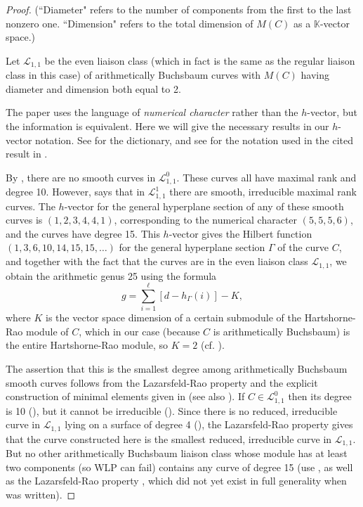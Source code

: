 \documentclass[12pt]{amsart}%
\numberwithin{equation}{section}
\theoremstyle{definition}
\numberwithin{equation}{section}
\begin{document}
   \begin{proof} 
    (``Diameter" refers to the number of components from the first to the last nonzero one. ``Dimension" refers to the total dimension of $M(C)$ as a $\mathbb{K}$-vector space.)


    Let $\mathcal L_{1,1}$ be the even liaison class (which in fact is the same as the regular liaison class in this case) of arithmetically Buchsbaum curves with $M(C)$ having diameter and dimension both equal to 2. 
    
    The paper \cite{BM2} uses the language of {\it numerical character} rather than the $h$-vector, but the information is equivalent. Here we will give the necessary results in our $h$-vector notation. See \cite[\S 1]{GM3}  for the dictionary, and see \cite[Notation 1.1]{BM2}  for the notation used in the cited result in \cite{BM2}.

    By \cite[Lemma 4.3]{BM2},  there are no smooth curves in $\mathcal L_{1,1}^0$. These curves all have maximal rank and degree 10. However, \cite[Proposition 4.7]{BM2}  says that in $\mathcal L_{1,1}^1$ there are smooth, irreducible maximal rank curves. The  $h$-vector for the general hyperplane section of any of these smooth curves is $(1,2,3,4,4,1)$, corresponding to the numerical character $(5,5,5,6)$, and the curves have degree 15. This $h$-vector gives the Hilbert function $(1,3,6,10,14, 15, 15 , \dots)$ for the general hyperplane section $\Gamma$ of the curve $C$, and  
    together with the fact that the curves are in the even liaison class $\mathcal L_{1,1}$, we obtain the arithmetic genus 25 using the formula 
\[
g = \sum_{i=1}^\ell [d - h_\Gamma(i)] - K  ,
\]
where $K$ is the vector space dimension of a certain submodule of the Hartshorne-Rao module of $C$, which in our case (because $C$ is arithmetically Buchsbaum) is the entire Hartshorne-Rao module, so $K = 2$ (cf. \cite[Proposition 1.4.2]{MBook}).


    The assertion that this is the smallest degree among arithmetically Buchsbaum smooth curves follows from the Lazarsfeld-Rao property and the explicit construction of minimal elements given in \cite{BM2} (see also \cite{GM1}). If $C \in \mathcal L^0_{1,1}$ then its degree is 10 (\cite[Theorem 3.1]{BM2}), but it cannot be irreducible (\cite[Theorem 2.12]{BM2}). Since there is no reduced, irreducible curve in $\mathcal L_{1,1}$ lying on a surface of degree 4 (\cite[Corollary 2.11 (b)]{BM2}), the Lazarsfeld-Rao property gives that the curve constructed here is the smallest reduced, irreducible curve in $\mathcal L_{1,1}$. But no other arithmetically Buchsbaum liaison class whose module has at least two components (so WLP can fail) contains any curve of degree 15 (use \cite[Theorem 3.1 and Theorem 2.1]{BM2}, as well as the Lazarsfeld-Rao property \cite{BBM}, which did not yet exist in full generality when \cite{BM2} was written).
   \end{proof}
\end{document}
